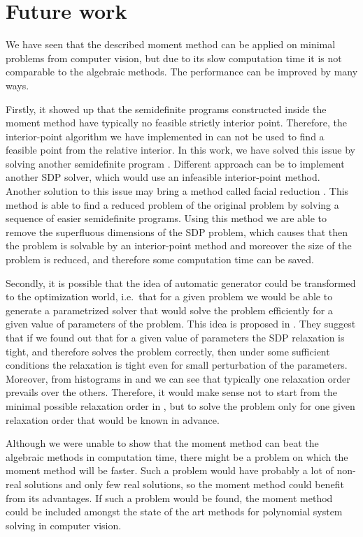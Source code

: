 \section{Future work}
We have seen that the described moment method can be applied on minimal problems from computer vision, but due to its slow computation time it is not comparable to the algebraic methods.
The performance can be improved by many ways.

Firstly, it showed up that the semidefinite programs constructed inside the moment method have typically no feasible strictly interior point.
Therefore, the interior-point algorithm we have implemented in  can not be used to find a feasible point from the relative interior.
In this work, we have solved this issue by solving another semidefinite program .
Different approach can be to implement another SDP solver, which would use an infeasible interior-point method.
Another solution to this issue may bring a method called facial reduction \cite{facial}.
This method is able to find a reduced problem of the original problem by solving a sequence of easier semidefinite programs.
Using this method we are able to remove the superfluous dimensions of the SDP problem, which causes that then the problem is solvable by an interior-point method and moreover the size of the problem is reduced, and therefore some computation time can be saved.

Secondly, it is possible that the idea of automatic generator \cite{autogen} could be transformed to the optimization world, i.e.\ that for a given problem we would be able to generate a parametrized solver that would solve the problem efficiently for a given value of parameters of the problem.
This idea is proposed in \cite{SDPstability}.
They suggest that if we found out that for a given value of parameters the SDP relaxation is tight, and therefore solves the problem correctly, then under some sufficient conditions the relaxation is tight even for small perturbation of the parameters.
Moreover, from histograms in  and  we can see that typically one relaxation order prevails over the others.
Therefore, it would make sense not to start from the minimal possible relaxation order in , but to solve the problem only for one given relaxation order that would be known in advance.

Although we were unable to show that the moment method can beat the algebraic methods in computation time, there might be a problem on which the moment method will be faster.
Such a problem would have probably a lot of non-real solutions and only few real solutions, so the moment method could benefit from its advantages.
If such a problem would be found, the moment method could be included amongst the state of the art methods for polynomial system solving in computer vision.

